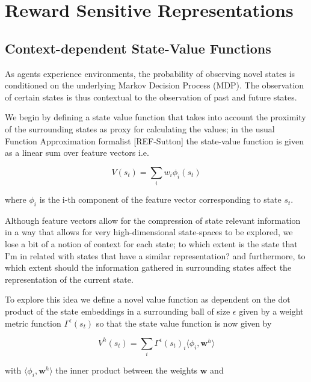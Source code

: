 \documentclass{article}
\begin{document}
\section{Reward Sensitive Representations}

\subsection{Context-dependent State-Value Functions}

As agents experience environments, the probability of observing novel states 
is conditioned on the underlying Markov Decision Process (MDP). The observation
of certain states is thus contextual to the observation of past and future states.

We begin by defining a state value function that takes into account the proximity 
of the surrounding states as proxy for calculating the values; in the usual Function Approximation
formalist [REF-Sutton] the state-value function is given as a linear sum over feature vectors i.e.

\begin{equation}
  V(s_t) = \sum_i w_i \phi_i(s_t)
\end{equation}

where $\phi_i$ is the i-th component of the feature vector corresponding to state $s_t$.

Although feature vectors allow for the compression of state relevant information in a way that 
allows for very high-dimensional state-spaces to be explored, we lose a bit of a notion of context
for each state; to which extent is the state that I'm in related with states that have a similar representation? 
and furthermore, to which extent should the information gathered in surrounding states affect the representation of the current state.

To explore this idea we define a novel value function as dependent on the dot product of the state embeddings in 
a surrounding ball of size $\epsilon$ given by a weight metric function $\Gamma^\epsilon(s_t)$ so that the 
state value function is now given by 

\begin{equation}
  V^h(s_t) = \sum_{i} \Gamma^\epsilon(s_t)_i \langle\phi_i,\mathbf{w}^h\rangle
\end{equation}

with $\langle\phi_i,\mathbf{w}^h\rangle$ the inner product between the weights $\mathbf{w}$ and
\end{document}
